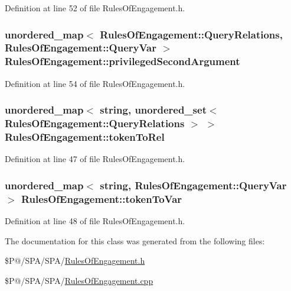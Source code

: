 Definition at line 52 of file Rules\-Of\-Engagement.\-h.

\hypertarget{class_rules_of_engagement_acdc0a8ed701246134911b36aac249c6c}{
\subsubsection[{privileged\-Second\-Argument}]{\setlength{\rightskip}{0pt plus 5cm}unordered\-\_\-map$<$ {\bf Rules\-Of\-Engagement\-::\-Query\-Relations}, {\bf Rules\-Of\-Engagement\-::\-Query\-Var} $>$ Rules\-Of\-Engagement\-::privileged\-Second\-Argument\hspace{0.3cm}{\ttfamily [static]}}}\label{class_rules_of_engagement_acdc0a8ed701246134911b36aac249c6c}


Definition at line 54 of file Rules\-Of\-Engagement.\-h.

\hypertarget{class_rules_of_engagement_ae9b3fd791855b69fdf746d47df2b2bdd}{
\subsubsection[{token\-To\-Rel}]{\setlength{\rightskip}{0pt plus 5cm}unordered\-\_\-map$<$ string, unordered\-\_\-set$<$ {\bf Rules\-Of\-Engagement\-::\-Query\-Relations} $>$ $>$ Rules\-Of\-Engagement\-::token\-To\-Rel\hspace{0.3cm}{\ttfamily [static]}}}\label{class_rules_of_engagement_ae9b3fd791855b69fdf746d47df2b2bdd}


Definition at line 47 of file Rules\-Of\-Engagement.\-h.

\hypertarget{class_rules_of_engagement_ab3e59955494f404502bf165417df74c9}{
\subsubsection[{token\-To\-Var}]{\setlength{\rightskip}{0pt plus 5cm}unordered\-\_\-map$<$ string, {\bf Rules\-Of\-Engagement\-::\-Query\-Var} $>$ Rules\-Of\-Engagement\-::token\-To\-Var\hspace{0.3cm}{\ttfamily [static]}}}\label{class_rules_of_engagement_ab3e59955494f404502bf165417df74c9}


Definition at line 48 of file Rules\-Of\-Engagement.\-h.



The documentation for this class was generated from the following files\-:\begin{DoxyCompactItemize}
\item 
\$\-P@/\-S\-P\-A/\-S\-P\-A/\hyperlink{_rules_of_engagement_8h}{Rules\-Of\-Engagement.\-h}\item 
\$\-P@/\-S\-P\-A/\-S\-P\-A/\hyperlink{_rules_of_engagement_8cpp}{Rules\-Of\-Engagement.\-cpp}\end{DoxyCompactItemize}
